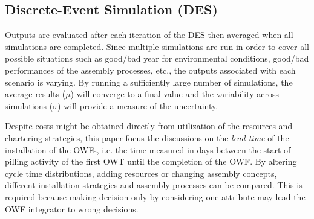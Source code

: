 \subsection{Discrete-Event Simulation (DES)}

Outputs are evaluated after each iteration of the DES then averaged when all simulations are completed. Since multiple simulations are run in order to cover all possible situations such as good/bad year for environmental conditions, good/bad performances of the assembly processes, etc., the outputs associated with each scenario is varying. By running a sufficiently large number of simulations, the average results ($\mu$) will converge to a final value and the variability across simulations ($\sigma$) will provide a measure of the uncertainty.

Despite costs might be obtained directly from utilization of the resources and chartering strategies, this paper focus the discussions on the \textit{lead time} of the installation of the OWFs, i.e. the time measured in days between the start of pilling activity of the first OWT until the completion of the OWF. By altering cycle time distributions, adding resources or changing assembly concepts, different installation strategies and assembly processes can be compared. This is required because making decision only by considering one attribute may lead the OWF integrator to wrong decisions.

